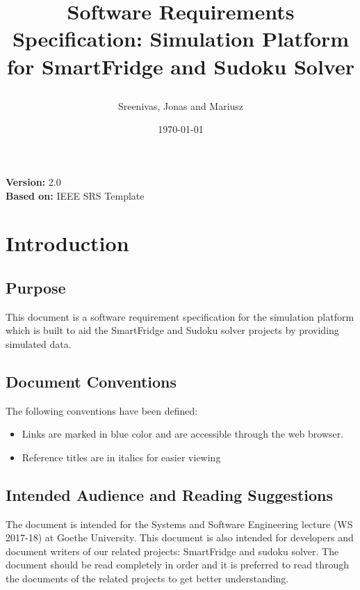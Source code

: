 \documentclass[a4paper,12pt]{article}
\begin{document}



\title{\begin{Huge}
\textbf{Software Requirements Specification: Simulation Platform for SmartFridge and Sudoku Solver}
\end{Huge}}
\author{\begin{Large}
Sreenivas, Jonas and Mariusz
\end{Large}}
\date{\today}
\maketitle
\thispagestyle{empty}
\begin{center}
\begin{large}
\textbf{Version:} 2.0
\\  \textbf{Based on:} IEEE SRS Template
\end{large}
\end{center}
\newpage
\tableofcontents \newpage
{}
\section{Introduction}
\subsection{Purpose}
This document is a software requirement specification for the simulation platform which is built to aid the SmartFridge and Sudoku solver projects by providing simulated data.
\subsection{Document Conventions}
The following conventions have been defined:
\begin{itemize}
\item Links are marked in blue color and are accessible through the web browser.
\item Reference titles are in italics for easier viewing
\end{itemize}
\subsection{Intended Audience and Reading Suggestions}
The document is intended for the Systems and Software Engineering lecture (WS 2017-18) at Goethe University. This document is also intended for developers and document writers of our related projects: SmartFridge and sudoku solver. The document should be read completely in order and it is preferred to read through the documents of the related projects to get better understanding.
\end{document}
